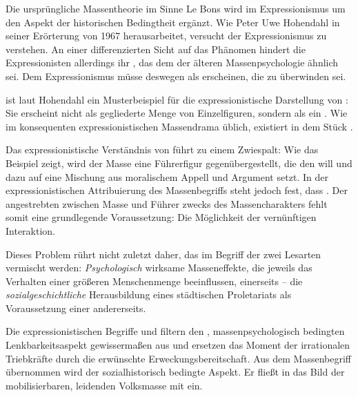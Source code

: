 Die ursprüngliche Massentheorie im Sinne Le Bons wird im Expressionismus um
den Aspekt der historischen Bedingtheit ergänzt. Wie Peter Uwe Hohendahl
in seiner Erörterung von 1967 herausarbeitet, versucht der Expressionismus
\Cite{die Masse als notwendige Folge einer fehlgeleiteten Entwicklung} zu
verstehen. An einer differenzierten Sicht auf das Phänomen hindert die
Expressionisten allerdings ihr \Cite{humanitär-individualistisches
  Menschenbild}, das dem der älteren Massenpsychologie ähnlich sei. Dem
Expressionismus müsse deswegen \Cite{die Massenhaftigkeit} als \Cite{Symptom
  einer kulturlosen, enthumanisierten Zivilisation} erscheinen, die zu
überwinden sei.

 ist laut Hohendahl ein Musterbeispiel für die
expressionistische Darstellung von \Cite{Masse}: Sie erscheint nicht als
gegliederte Menge von Einzelfiguren, sondern als ein \Cite{geschlossener,
  blockartiger Körper, der auch seine eigene Sprache spricht}. Wie im konsequenten
expressionistischen Massendrama üblich, existiert in dem Stück \Cite{mit
  Ausnahme der Führergestalt das Individuum nicht mehr}. 

Das expressionistische Verständnis von \Cite{Masse} führt zu einem Zwiespalt:
Wie das Beispiel \Cite{der Frau} zeigt, wird der \Cite{gestaltlosen} Masse
eine Führerfigur gegenübergestellt, die den \Cite{Mensch in Masse befrein}
 will und dazu auf eine Mischung aus moralischem Appell
und Argument setzt. In der expressionistischen Attribuierung des
Massenbegriffs steht jedoch fest, dass \Cite{der Massenmensch unter der
  Herrschaft des Irrationalen [steht]}. 
Der angestrebten  zwischen Masse und Führer zwecks
\Cite{Überwindung} des Massencharakters fehlt somit eine grundlegende
Voraussetzung: Die Möglichkeit der vernünftigen Interaktion.   

Dieses Problem rührt nicht zuletzt daher, das im Begriff der \Cite{Masse} zwei
Lesarten vermischt werden: \emph{Psychologisch}
wirksame Masseneffekte, die jeweils \Cite{aktuell} das Verhalten einer
größeren Menschenmenge beeinflussen, einerseits -- die  \emph{sozialgeschichtliche}
Herausbildung eines städtischen Proletariats als Voraussetzung einer
\Cite{latenten Masse} andererseits. 

Die expressionistischen Begriffe \Cite{Volk} und \Cite{Gemeinschaft} filtern
den \Cite{aktuellen}, massenpsychologisch bedingten Lenkbarkeitsaspekt
gewissermaßen aus und ersetzen das Moment der irrationalen Triebkräfte durch die
erwünschte Erweckungsbereitschaft. Aus dem Massenbegriff übernommen wird der
sozialhistorisch bedingte Aspekt. Er fließt in das Bild der \Cite{latent}
mobilisierbaren, leidenden Volksmasse mit ein.

